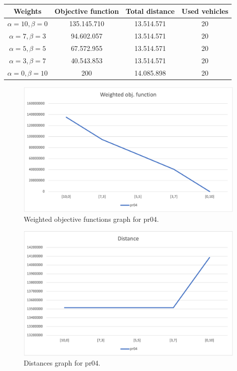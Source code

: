 {
\renewcommand{\arraystretch}{2}
\begin{longtable}[h]{| c | c | c | c |}
    \hline
    \textbf{Weights} & \textbf{Objective function} & \textbf{Total distance} & \textbf{Used vehicles} \\
    \hline
    \endhead
    $\alpha = 10, \beta = 0$ & 135.145.710 & 13.514.571 & 20 \\
    \hline
    $\alpha = 7, \beta = 3$  &  94.602.057 & 13.514.571 & 20 \\
    \hline
    $\alpha = 5, \beta = 5$  &  67.572.955 & 13.514.571 & 20 \\
    \hline
    $\alpha = 3, \beta = 7$  &  40.543.853 & 13.514.571 & 20 \\
    \hline
    $\alpha = 0, \beta = 10$ &         200 & 14.085.898 & 20 \\
    \hline
\end{longtable}
}
\begin{figure}[H]
    \centering
    \includegraphics[width=1.0\columnwidth]{../graphs/pr04-wobjf.png}
    \caption{Weighted objective functions graph for pr04.}
\end{figure}

\begin{figure}[H]
    \centering
    \includegraphics[width=1.0\columnwidth]{../graphs/pr04-distance.png}
    \caption{Distances graph for pr04.}
\end{figure}

